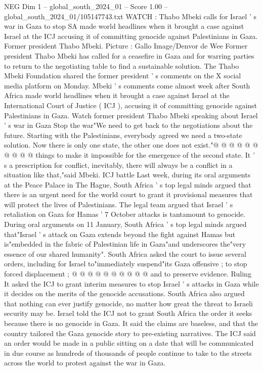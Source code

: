 \begin{textsample}{NEG Dim 1 – global\_south\_2024\_01 – Score 1.00 – global\_south\_2024\_01/105147743.txt}  \label{ex:f1_neg_329}
WATCH : Thabo Mbeki calls for Israel ' s war in Gaza to stop SA made world headlines when it brought a case against Israel at the ICJ accusing it of committing genocide against Palestinians in Gaza.
Former president Thabo Mbeki.
Picture : Gallo Image/Denvor de Wee Former president Thabo Mbeki has called for a ceasefire in Gaza and for warring parties to return to the negotiating table to find a sustainable solution.
The Thabo Mbeki Foundation shared the former president ' s comments on the X social media platform on Monday.
Mbeki ' s comments come almost week after South Africa made world headlines when it brought a case against Israel at the International Court of Justice ( ICJ ), accusing it of committing genocide against Palestinians in Gaza.
Watch former president Thabo Mbeki speaking about Israel ' s war in Gaza Stop the war"We need to get back to the negotiations about the future.
Starting with the Palestinians, everybody agreed we need a two-state solution.
Now there is only one state, the other one does not exist."@ @ @ @ @ @ @ @ @ @ things to make it impossible for the emergence of the second state.
It ' s a prescription for conflict, inevitably, there will always be a conflict in a situation like that,"said Mbeki.
ICJ battle Last week, during its oral arguments at the Peace Palace in The Hague, South Africa ' s top legal minds argued that there is an urgent need for the world court to grant it provisional measures that will protect the lives of Palestinians.
The legal team argued that Israel ' s retaliation on Gaza for Hamas ' 7 October attacks is tantamount to genocide.
During oral arguments on 11 January, South Africa ' s top legal minds argued that"Israel ' s attack on Gaza extends beyond the fight against Hamas but is"embedded in the fabric of Palestinian life in Gaza"and underscores the"very essence of our shared humanity".
South Africa asked the court to issue several orders, including for Israel to"immediately suspend"its Gaza offensive ; to stop forced displacement ; @ @ @ @ @ @ @ @ @ @ and to preserve evidence.
Ruling It asked the ICJ to grant interim measures to stop Israel ' s attacks in Gaza while it decides on the merits of the genocide accusations.
South Africa also argued that nothing can ever justify genocide, no matter how great the threat to Israeli security may be.
Israel told the ICJ not to grant South Africa the order it seeks because there is no genocide in Gaza.
It said the claims are baseless, and that the country tailored the Gaza genocide story to pre-existing narratives.
The ICJ said an order would be made in a public sitting on a date that will be communicated in due course as hundreds of thousands of people continue to take to the streets across the world to protest against the war in Gaza.

\end{textsample}
